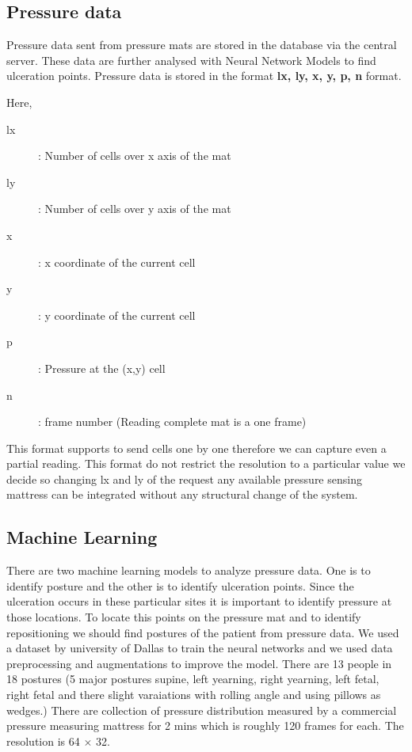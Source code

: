 \subsection{Pressure data}

Pressure data sent from pressure mats are stored in the database via the central server. These data are further analysed with Neural Network Models to find ulceration points. Pressure data is stored in the format \textbf{lx, ly, x, y, p, n} format. 

Here,

\begin{description}
	\item[lx]: Number of cells over x axis of the mat 
	\item[ly]: Number of cells over y axis of the mat 
	\item[x]: x coordinate of the current cell 
	\item[y]: y coordinate of the current cell  
	\item[p]: Pressure at the (x,y) cell
	\item[n]: frame number (Reading complete mat is a one frame)  
\end{description}

This format supports to send cells one by one therefore we can capture even a partial reading. This format do not restrict the resolution to a particular value we decide so changing lx and ly of the request any available pressure sensing mattress can be integrated without any structural change of the system. 

\subsection{Machine Learning}

There are two machine learning models to analyze pressure data. One is to identify posture and the other is to identify ulceration points. Since the ulceration occurs in these particular sites it is important to identify pressure at those locations. To locate this points on the pressure mat and to identify repositioning we should find postures of the patient from pressure data. 
We used a dataset by university of Dallas to train the neural networks and we used data preprocessing and augmentations to improve the model. There are 13 people in 18 postures (5 major postures supine, left yearning, right yearning, left fetal, right fetal and there slight varaiations with rolling angle and using pillows as wedges.) There are collection of pressure distribution measured by a commercial pressure measuring mattress for 2 mins which is roughly 120 frames for each. The resolution is 64 $\times$ 32.

